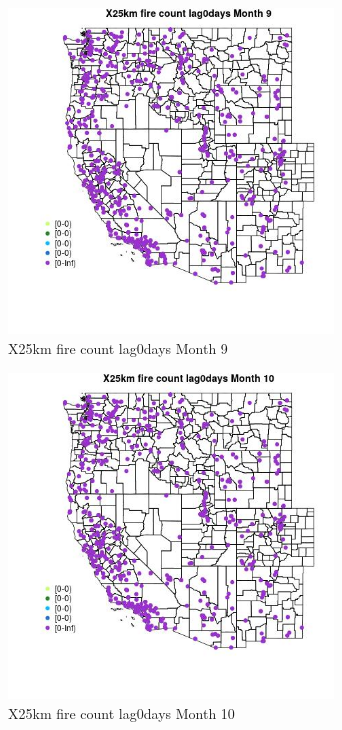 \begin{figure} 
\centering  
\includegraphics[width=0.77\textwidth]{Code_Outputs/Report_ML_input_PM25_Step4_part_e_de_duplicated_aves_compiled_2019-05-14wNAs_MapObsMo9X25km_fire_count_lag0days.jpg} 
\caption{\label{fig:Report_ML_input_PM25_Step4_part_e_de_duplicated_aves_compiled_2019-05-14wNAsMapObsMo9X25km_fire_count_lag0days}X25km fire count lag0days Month 9} 
\end{figure} 
 

\begin{figure} 
\centering  
\includegraphics[width=0.77\textwidth]{Code_Outputs/Report_ML_input_PM25_Step4_part_e_de_duplicated_aves_compiled_2019-05-14wNAs_MapObsMo10X25km_fire_count_lag0days.jpg} 
\caption{\label{fig:Report_ML_input_PM25_Step4_part_e_de_duplicated_aves_compiled_2019-05-14wNAsMapObsMo10X25km_fire_count_lag0days}X25km fire count lag0days Month 10} 
\end{figure} 
 

